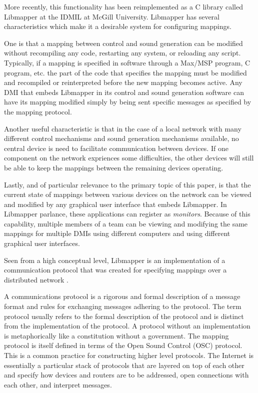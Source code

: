 More recently, this functionality has been reimplemented as a C library called Libmapper at the IDMIL at McGill University. Libmapper has several characteristics which make it a desirable system for configuring mappings. 

One is that a mapping between control and sound generation can be modified without recompiling any code, restarting any system, or reloading any script. Typically, if a mapping is specified in software through a Max/MSP program, C program, etc. the part of the code that specifies the mapping must be modified and recompiled or reinterpreted before the new mapping becomes active. Any DMI that embeds Libmapper in its control and sound generation software can have its mapping modified simply by being sent specific messages as specified by the mapping protocol. 

Another useful characteristic is that in the case of a local network with many different control mechanisms and sound generation mechanisms available, no central device is need to facilitate communication between devices. If one component on the network expriences some difficulties, the other devices will still be able to keep the mappings between the remaining devices operating.  

Lastly, and of particular relevance to the primary topic of this paper, is that the current state of mappings between various devices on the network can be viewed and modified by any graphical user interface that embeds Libmapper. In Libmapper parlance, these applications can register as \emph{monitors}. Because of this capability, multiple members of a team can be viewing and modifying the same mappings for multiple DMIs using different computers and using different graphical user interfaces.  

Seen from a high conceptual level, Libmapper is an implementation of a communication protocol that was created for specifying mappings over a distributed network \cite{Malloch2009}. 

A communications protocol is a rigorous and formal description of a message format and rules for exchanging messages adhering to the protocol. The term protocol usually refers to the formal description of the protocol and is distinct from the implementation of the protocol. A protocol without an implementation is metaphorically like a constitution without a government. The mapping protocol is itself defined in terms of the Open Sound Control (OSC) protocol. This is a common practice for constructing higher level protocols. The Internet is essentially a particular stack of protocols that are layered on top of each other and specify how devices and routers are to be addressed, open connections with each other, and interpret messages.

